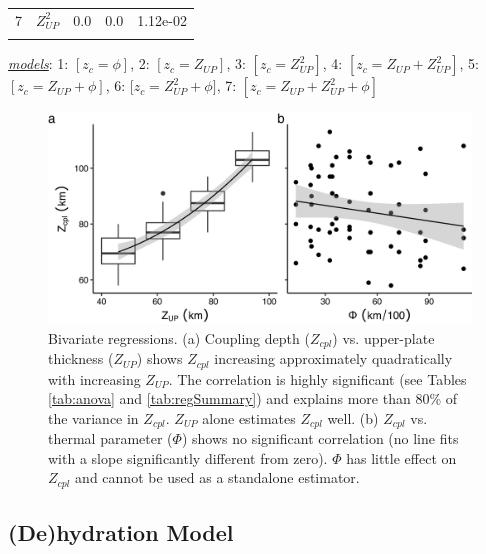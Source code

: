 \begin{table}
\begin{threeparttable}
\begin{tabular}[t]{llrrl}
7 & $Z_{UP}^2$ & 0.0 & 0.0 & 1.12e-02\\
\cellcolor{gray!6}{7} & \cellcolor{gray!6}{$\phi$} & \cellcolor{gray!6}{-0.1} & \cellcolor{gray!6}{0.0} & \cellcolor{gray!6}{7.28e-04}\\
\bottomrule
\end{tabular}
\begin{tablenotes}
\item \uline{\textit{models}}: 1: $[z_c=\phi]$, 2: $[z_c=Z_{UP}]$, 3: $[z_c=Z_{UP}^2]$, 4: $[z_c=Z_{UP}+Z_{UP}^2]$, 5: $[z_c=Z_{UP}+\phi]$, 6: [$z_c=Z_{UP}^2+\phi]$, 7: $[z_c=Z_{UP}+Z_{UP}^2+\phi]$
\end{tablenotes}
\end{threeparttable}
\end{table}

\begin{figure}[htbp]

{\centering \includegraphics[width=1\linewidth,]{assets/figs/chpt2/figA6} 

}

\caption[Bivariate regressions of coupling results]{Bivariate regressions. (a) Coupling depth ($Z_{cpl}$) vs. upper-plate thickness ($Z_{UP}$) shows $Z_{cpl}$ increasing approximately quadratically with increasing $Z_{UP}$. The correlation is highly significant (see Tables \ref{tab:anova} and \ref{tab:regSummary}) and explains more than 80\% of the variance in $Z_{cpl}$. $Z_{UP}$ alone estimates $Z_{cpl}$ well. (b) $Z_{cpl}$ vs. thermal parameter ($\Phi$) shows no significant correlation (no line fits with a slope significantly different from zero). $\Phi$ has little effect on $Z_{cpl}$ and cannot be used as a standalone estimator.}\label{fig:biv}
\end{figure}

\clearpage

\hypertarget{deHydration}{%
\subsection{(De)hydration Model}\label{deHydration}}

